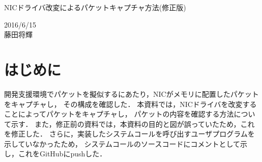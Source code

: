 \documentclass[12pt]{jsarticle}
\begin{document}

\begin{center}
    {\LARGE NICドライバ改変によるパケットキャプチャ方法(修正版)}
\end{center}

\begin{flushright}
    2016/6/15\\
    藤田将輝
\end{flushright}
\section{はじめに}
開発支援環境でパケットを擬似するにあたり，NICがメモリに配置したパケットをキャプチャし，
その構成を確認した．
本資料では，NICドライバを改変することによってパケットをキャプチャし，
パケットの内容を確認する方法について示す．
また，修正前の資料では，本資料の目的と図が誤っていたため，これを修正した．
さらに，実装したシステムコールを呼び出すユーザプログラムを示していなかったため，
システムコールのソースコードにコメントとして示し，これをGitHubにpushした．
\end{document}
